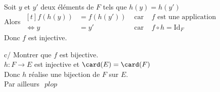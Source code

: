 \documentclass[12pt,twoside,a4paper]{article}
\begin{document}
\begin{preuve}
\begin{liste}
\begin{liste}
						Soit $y$ et $y'$ deux éléments de $F$ tels que $h(y)=h(y')$\\
						Alors 
						$\begin{aligned}[t]
						f(h(y))&=f(h(y')) & \text{ car } & f\text{ est une application}\\
						\iff y&=y' & \text{ car } & f\circ h = \text{Id}_F
						\end{aligned}$\\
						Donc $f$ est injective.
					\item[c/] Montrer que $f$ est bijective.\\
						$h:F\longrightarrow E$ est injective et $\card(E)=\card(F)$\\
						Donc $h$ réalise une bijection de $F$ sur $E$.\\
						Par ailleurs 
						$\begin{aligned}
						plop %
						\end{aligned}$
				\end{liste}
		\end{liste}
	\end{preuve}
\end{document}

